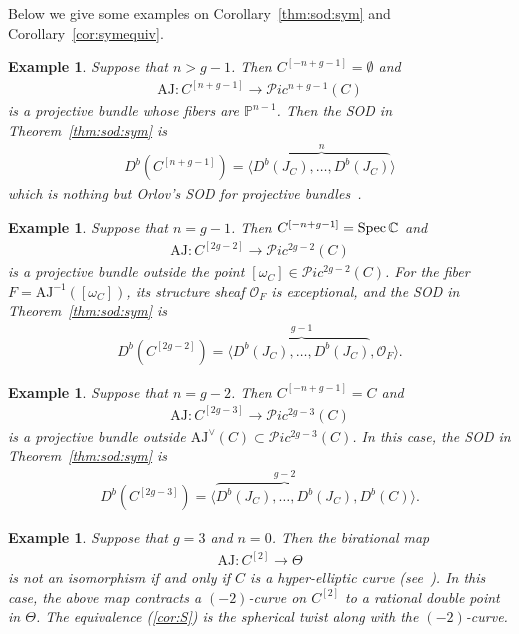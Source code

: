 \documentclass[11pt]{amsart}
\theoremstyle{plain}
\newtheorem{exam}[thm]{Example}
\newcommand{\oO}{\mathcal{O}}
\newcommand{\pP}{\mathcal{P}}
\newcommand{\Spec}{\mathop{\rm Spec}\nolimits}
\begin{document}
Below we give some examples on Corollary~\ref{thm:sod:sym}
and Corollary~\ref{cor:symequiv}. 
\begin{exam} Suppose that $n>g-1$. Then 
$C^{[-n+g-1]}=\emptyset$ and 
\begin{align*}
\mathrm{AJ} \colon C^{[n+g-1]} \to \pP ic^{n+g-1}(C)
\end{align*}
is a projective bundle whose fibers are
$\mathbb{P}^{n-1}$. 
Then the 
SOD in Theorem~\ref{thm:sod:sym} is
\begin{align*}
D^b(C^{[n+g-1]})=
\langle \overbrace{D^b(J_C), \ldots, 
D^b(J_C)}^{n}
 \rangle
\end{align*}
which is nothing but Orlov's SOD 
for projective bundles~\cite{MR1208153}. 
\end{exam}

\begin{exam}
Suppose that $n=g-1$. 
Then $C^{[-n+g-1]}=\Spec \mathbb{C}$
and 
\begin{align*}
\mathrm{AJ} \colon C^{[2g-2]} \to \pP ic^{2g-2}(C)
\end{align*}
is a projective bundle 
outside the point $[\omega_C] \in \pP ic^{2g-2}(C)$. 
For the fiber $F=\mathrm{AJ}^{-1}([\omega_C])$, 
its structure sheaf $\oO_F$ is exceptional, and the 
SOD in Theorem~\ref{thm:sod:sym}
is
\begin{align*}
D^b(C^{[2g-2]})=
\langle \overbrace{D^b(J_C), \ldots, 
D^b(J_C)}^{g-1}, \oO_F \rangle. 
\end{align*}
\end{exam}

\begin{exam}
 Suppose that $n=g-2$. 
Then $C^{[-n+g-1]}=C$ and 
\begin{align*}
\mathrm{AJ} \colon C^{[2g-3]} \to \pP ic^{2g-3}(C)
\end{align*}
is a projective bundle outside 
$\mathrm{AJ}^{\vee}(C) \subset \pP ic^{2g-3}(C)$. 
In this case, the SOD in Theorem~\ref{thm:sod:sym} is
\begin{align*}
D^b(C^{[2g-3]})=
\langle \overbrace{D^b(J_C), \ldots, 
D^b(J_C)}^{g-2}, D^b(C) \rangle. 
\end{align*}
\end{exam}

\begin{exam}
 Suppose that $g=3$ and $n=0$. 
Then the birational map 
\begin{align*}
\mathrm{AJ} \colon C^{[2]} \to \Theta
\end{align*}
is not an isomorphism if and only if 
$C$ is a hyper-elliptic curve (see~\cite[Example~1.0.9]{MR3114949}). 
In this case, the above map contracts a 
$(-2)$-curve on $C^{[2]}$
to a rational double point in $\Theta$. 
The equivalence (\ref{cor:S})
is the spherical twist along with the $(-2)$-curve. 
\end{exam}
\end{document}
